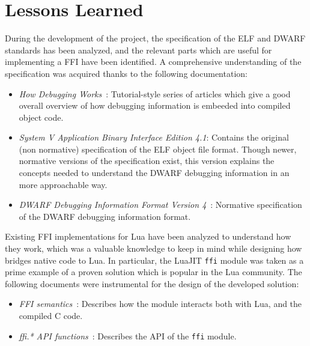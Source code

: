 \section{Lessons Learned}

During the development of the project, the specification of the ELF and DWARF
standards has been analyzed, and the relevant parts which are useful for
implementing a \gls{FFI} have been identified. A comprehensive understanding
of the specification was acquired thanks to the following documentation:

\begin{itemize}

	\item \emph{How Debugging Works}~\cite{howdebugworks}: Tutorial-style
	series of articles which give a good overall overview of how debugging
	information is embeeded into compiled object code.

	\item \emph{System V Application Binary Interface Edition
	4.1}\cite{elfspec-sysv}: Contains the original (non normative)
	  specification of the ELF object file format. Though newer, normative
	  versions of the specification exist, this version explains the concepts
	  needed to understand the DWARF debugging information in an more
	  approachable way.

	\item \emph{DWARF Debugging Information Format Version
	4}~\cite{dwarfspecv4}: Normative specification of the DWARF debugging
	  information format.

\end{itemize}

Existing FFI implementations for Lua have been analyzed to understand how they
work, which was a valuable knowledge to keep in mind while designing how \Eol*
bridges native code to Lua. In particular, the LuaJIT \verb|ffi| module was
taken as a prime example of a proven solution which is popular in the Lua
community. The following documents were instrumental for the design of the
developed solution:

\begin{itemize}

	\item \emph{FFI semantics}~\cite{lj-ffi-semantic}: Describes how the
	module interacts both with Lua, and the compiled C code.

	\item \emph{ffi.* API functions}~\cite{lj-ffi-api}: Describes the API
	of the \verb|ffi| module.

\end{itemize}

